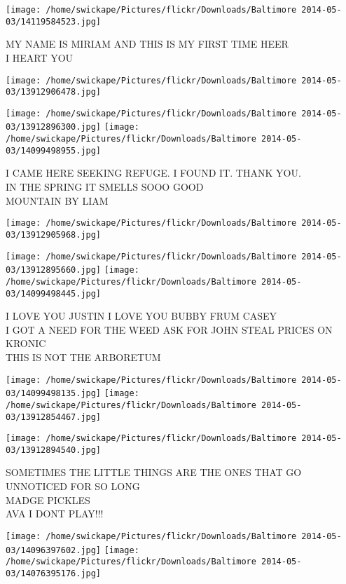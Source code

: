 \documentclass[10pt,letterpaper]{article}
\begin{document}
\vspace{0.25in}
\texttt{[image: /home/swickape/Pictures/flickr/Downloads/Baltimore 2014-05-03/14119584523.jpg]}

MY NAME IS MIRIAM AND THIS IS MY FIRST TIME HEER\\
I HEART YOU
\pagebreak

\texttt{[image: /home/swickape/Pictures/flickr/Downloads/Baltimore 2014-05-03/13912906478.jpg]}

\vspace{0.25in}
\texttt{[image: /home/swickape/Pictures/flickr/Downloads/Baltimore 2014-05-03/13912896300.jpg]}
\texttt{[image: /home/swickape/Pictures/flickr/Downloads/Baltimore 2014-05-03/14099498955.jpg]}

I CAME HERE SEEKING REFUGE. I FOUND IT.  THANK YOU.\\
IN THE SPRING IT SMELLS SOOO GOOD\\
MOUNTAIN BY LIAM
\pagebreak

\texttt{[image: /home/swickape/Pictures/flickr/Downloads/Baltimore 2014-05-03/13912905968.jpg]}

\vspace{0.25in}
\texttt{[image: /home/swickape/Pictures/flickr/Downloads/Baltimore 2014-05-03/13912895660.jpg]}
\texttt{[image: /home/swickape/Pictures/flickr/Downloads/Baltimore 2014-05-03/14099498445.jpg]}

I LOVE YOU JUSTIN I LOVE YOU BUBBY FRUM CASEY\\
I GOT A NEED FOR THE WEED ASK FOR JOHN STEAL PRICES ON KRONIC\\
THIS IS NOT THE ARBORETUM
\pagebreak

\texttt{[image: /home/swickape/Pictures/flickr/Downloads/Baltimore 2014-05-03/14099498135.jpg]}
\texttt{[image: /home/swickape/Pictures/flickr/Downloads/Baltimore 2014-05-03/13912854467.jpg]}

\vspace{0.25in}
\texttt{[image: /home/swickape/Pictures/flickr/Downloads/Baltimore 2014-05-03/13912894540.jpg]}

SOMETIMES THE LITTLE THINGS ARE THE ONES THAT GO UNNOTICED FOR SO LONG\\
MADGE PICKLES\\
AVA I DONT PLAY!!!
\pagebreak

\texttt{[image: /home/swickape/Pictures/flickr/Downloads/Baltimore 2014-05-03/14096397602.jpg]}
\texttt{[image: /home/swickape/Pictures/flickr/Downloads/Baltimore 2014-05-03/14076395176.jpg]}
\end{document}
